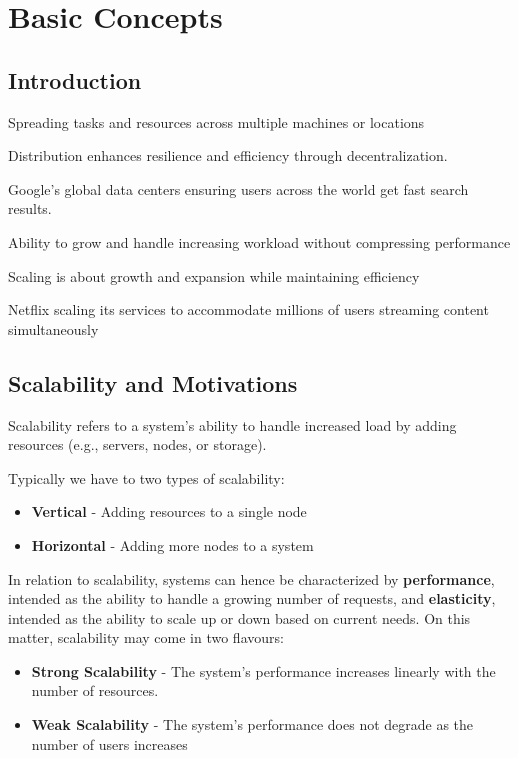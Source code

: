 \chapter{Basic Concepts}

\section{Introduction}
\begin{definition}[Distributed]
   Spreading tasks and resources across multiple machines or locations
\end{definition}

Distribution enhances resilience and efficiency through decentralization.

\begin{example}
   Google's global data centers ensuring users across the world get fast search results.
\end{example}

\begin{definition}[Scalable]
   Ability to grow and handle increasing workload without compressing performance
\end{definition}

Scaling is about growth and expansion while maintaining efficiency

\begin{example}
   Netflix scaling its services to accommodate millions of users streaming content simultaneously
\end{example}

\section{Scalability and Motivations}
Scalability refers to a system's ability to handle increased load by adding resources (e.g., servers, nodes, or storage).
{Typically we have to two types of scalability:\ns
\begin{itemize}
   \item \textbf{Vertical} - Adding resources to a single node
   \item \textbf{Horizontal} - Adding more nodes to a system
\end{itemize}}

In relation to scalability, systems can hence be characterized by \textbf{performance}, intended as the ability to handle a growing number of requests, and \textbf{elasticity}, intended as the ability to scale up or down based on current needs.
On this matter, scalability may come in two flavours:
\begin{itemize}
   \label{sec:weak_strong_scalability}
   \item \textbf{Strong Scalability} - The system's performance increases linearly with the number of resources.
   \item \textbf{Weak Scalability} - The system's performance does not degrade as the number of users increases
\end{itemize}

